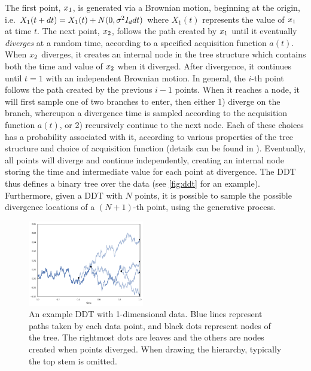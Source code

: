 The first point, $x_1$, is generated
via a Brownian motion, beginning at the origin, i.e.
$X_1(t + dt) = X_1(t) + N(0, \sigma^2I_ddt)$
where $X_1(t)$ represents the value of $x_1$ at time $t$.
The next point, $x_2$, follows the path created
by $x_1$ until
it eventually \emph{diverges}
at a random time, according to a specified
acquisition function $a(t)$.
When $x_2$ diverges, it creates
an internal node in the tree structure
which contains both the time and value of $x_2$
when it diverged.
After divergence, it continues until $t = 1$ with 
an independent Brownian motion.
In general, the $i$-th point
follows the path created by the 
previous $i - 1$ points.
When it reaches a node, it
will first sample one of two branches
to enter, then
either 1) diverge on the branch,
whereupon a divergence time is sampled
according to the acquisition function $a(t)$,
or 2) recursively continue to the next node.
Each of these choices has a probability
associated with it, according to various properties
of the tree structure and choice of acquisition function
(details can be found in \cite{N03}).
Eventually, all points will diverge and continue independently,
creating an internal node storing the time and
intermediate value for each point at divergence.
The DDT thus defines a binary tree over the data
(see \autoref{fig:ddt} for an example).
Furthermore, given a DDT with $N$ points,
it is possible to sample the possible divergence
locations of a $(N + 1)$-th point, using
the generative process. 

\begin{figure}[h]
    \centering
    \includegraphics[width=0.45\textwidth]{img/ibhc/ddt}
    \caption{An example DDT with 1-dimensional data. Blue lines represent paths
    taken by each data point, and black dots represent nodes of the tree.
    The rightmost dots are leaves and the others are nodes
    created when points diverged. When drawing the hierarchy,
    typically the top stem is omitted.}
    \label{fig:ddt}
\end{figure}


